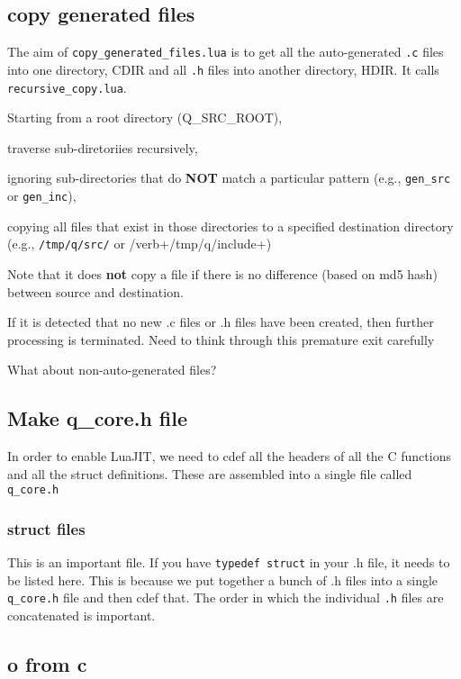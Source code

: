 \subsection{copy generated files}
\label{copy_generated_files}

The aim of {\tt copy\_generated\_files.lua} is to get all the auto-generated 
{\tt .c} files into one directory, CDIR
and all {\tt .h} files into another directory, HDIR. It calls {\tt
recursive\_copy.lua}. 

\bi
\item Starting from a root directory (Q\_SRC\_ROOT), 
\item traverse sub-diretoriies recursively, 
\item ignoring sub-directories that do {\bf NOT} match a particular
pattern (e.g., \verb+gen_src+ or \verb+gen_inc+), 
\item copying all files that exist in
those directories to a specified destination directory (e.g., \verb+/tmp/q/src/+
or /verb+/tmp/q/include+)
\item Note that it does {\bf not} copy a file if there is no difference (based
on md5 hash) between source and destination.
\ei

If it is detected that no new .c files or .h files have been created, then
further processing is terminated. Need to think through this premature exit
carefully \TBC


What about non-auto-generated files? \TBC

\subsection{Make q\_core.h file}
\label{mk_q_core_h}

In order to enable LuaJIT, we need to cdef all the headers of all the C
functions and all the struct definitions. These are assembled into a single file
called \verb+q_core.h+

\subsubsection{struct files}
\label{struct_files}

This is an important file. If you have {\tt typedef struct} in your .h file, it
needs to be listed here. This is because we put together a bunch of .h files
into a single {\tt q\_core.h} file and then cdef that. The order in which the individual {\tt .h} files are concatenated is important.

\subsection{o from c}
\label{o_from_c}

